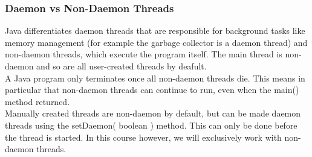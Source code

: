\documentclass[main]{subfiles}
\begin{document}
\subsubsection{Daemon vs Non-Daemon Threads}
Java differentiates daemon threads that are responsible for background tasks like memory management (for example the garbage collector is a daemon thread) and non-daemon threads, which execute the program itself. The main thread is non-daemon and so are all user-created threads by deafult.\\
A Java program only terminates once all non-daemon threads die. This means in particular that non-daemon threads can continue to run, even when the main() method returned.\\
Manually created threads are non-daemon by default, but can be made daemon threads using the setDaemon( boolean ) method. This can only be done before the thread is started. In this course however, we will exclusively work with non-daemon threads.
\end{document}
